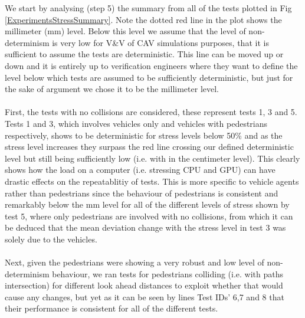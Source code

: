 \noindent We start by analysing (step 5) the summary from all of the tests plotted in Fig \ref{ExperimentsStressSummary}. 
Note the dotted red line in the plot shows the millimeter (mm) level. 
Below this level we assume that the level of non-determinism is very low for V\&V of CAV simulations purposes, that it is sufficient to assume the tests are deterministic. 
This line can be moved up or down and it is entirely up to verification engineers where they want to define the level below which tests are assumed to be sufficiently deterministic, but just for the sake of argument we chose it to be the millimeter level.\\\\
First, the tests with no collisions are considered, these represent tests 1, 3 and 5.
Tests 1 and 3, which involves vehicles only and vehicles with pedestrians respectively, shows to be deterministic for stress levels below 50\% and as the stress level increases they surpass the red line crossing our defined deterministic level but still being sufficiently low (i.e. with in the centimeter level). This clearly shows how the load on a computer (i.e. stressing CPU and GPU) can have drastic effects on the repeatablitiy of tests.
This is more specific to vehicle agents rather than pedestrians since the behaviour of pedestrians is consistent and remarkably below the mm level for all of the different levels of stress shown by test 5, where only pedestrians are involved with no collisions, from which it can be deduced that the mean deviation change with the stress level in test 3 was solely due to the vehicles. \\\\
Next, given the pedestrians were showing a very robust and low level of non-determinism behaviour, we ran tests for pedestrians colliding (i.e. with paths intersection) for different look ahead distances to exploit whether that would cause any changes, but yet as it can be seen by lines Test IDs' 6,7 and 8 that their performance is consistent for all of the different tests.


